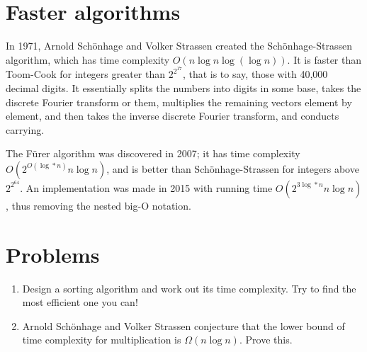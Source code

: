 \documentclass[10pt,a4paper]{article}
\begin{document}
\begin{multicols}{2}
	\section{Faster algorithms}
	In 1971, Arnold Sch\"onhage and Volker Strassen created the Sch\"onhage-Strassen algorithm, which has time complexity \(O(n\log{}n\log(\log{}n))\). It is faster than Toom-Cook for integers greater than \(2^{2^17}\), that is to say, those with 40,000 decimal digits. It essentially splits the numbers into digits in some base, takes the discrete Fourier transform or them, multiplies the remaining vectors element by element, and then takes the inverse discrete Fourier transform, and conducts carrying.
	
	The F\"urer algorithm was discovered in 2007; it has time complexity \(O(2^{O(\log*n)}n\log{}n)\), and is better than Schönhage-Strassen for integers above \(2^{2^{64}}\). An implementation was made in 2015 with running time \(O(2^{3\log*n}n\log{}n)\), thus removing the nested big-O notation.
	\section{Problems}
	\begin{enumerate}
		\item Design a sorting algorithm and work out its time complexity. Try to find the most efficient one you can!
		\item Arnold Sch\"onhage and Volker Strassen conjecture that the lower bound of time complexity for multiplication is \(\Omega(n\log{}n)\). Prove this.
	\end{enumerate}
	
\end{multicols}
\end{document}
